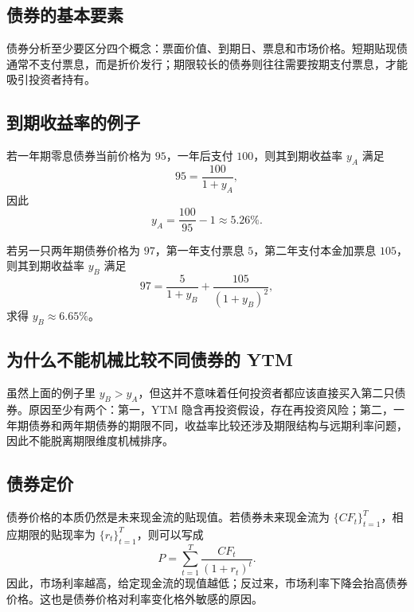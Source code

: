 \documentclass[UTF8,11pt,a4paper]{ctexart}
\begin{document}
\subsection{债券的基本要素}

债券分析至少要区分四个概念：票面价值、到期日、票息和市场价格。短期贴现债通常不支付票息，而是折价发行；期限较长的债券则往往需要按期支付票息，才能吸引投资者持有。

\subsection{到期收益率的例子}

若一年期零息债券当前价格为 $95$，一年后支付 $100$，则其到期收益率 $y_A$ 满足
\begin{equation}
  95 = \frac{100}{1+y_A},
\end{equation}
因此
\begin{equation}
  y_A = \frac{100}{95} - 1 \approx 5.26\%.
\end{equation}

若另一只两年期债券价格为 $97$，第一年支付票息 $5$，第二年支付本金加票息 $105$，则其到期收益率 $y_B$ 满足
\begin{equation}
  97 = \frac{5}{1+y_B} + \frac{105}{(1+y_B)^2},
\end{equation}
求得 $y_B \approx 6.65\%$。

\subsection{为什么不能机械比较不同债券的 YTM}

虽然上面的例子里 $y_B > y_A$，但这并不意味着任何投资者都应该直接买入第二只债券。原因至少有两个：第一，YTM 隐含再投资假设，存在再投资风险；第二，一年期债券和两年期债券的期限不同，收益率比较还涉及期限结构与远期利率问题，因此不能脱离期限维度机械排序。

\subsection{债券定价}

债券价格的本质仍然是未来现金流的贴现值。若债券未来现金流为 $\{CF_t\}_{t=1}^{T}$，相应期限的贴现率为 $\{r_t\}_{t=1}^{T}$，则可以写成
\begin{equation}
  P = \sum_{t=1}^{T} \frac{CF_t}{(1+r_t)^t}.
\end{equation}
因此，市场利率越高，给定现金流的现值越低；反过来，市场利率下降会抬高债券价格。这也是债券价格对利率变化格外敏感的原因。
\end{document}
